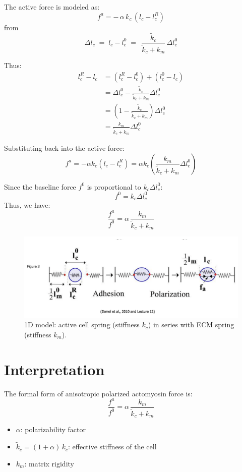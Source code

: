 \documentclass[a4paper,margin=1in]{article}
\begin{document}
The active force is modeled as:
\[
  f^a = -\,\alpha\,k_c\,(l_c - l_c^R)
\]
from
\[
  \Delta l_c \;=\; l_c - l_c^0 \;=\; \,\frac{\tilde{k}_c}{\tilde{k}_c + k_m} \,\Delta l_c^0
\]

Thus:
\begin{align*}
l_c^R - l_c &= (l_c^R - l_c^0) + (l_c^0 - l_c) \\
&= \Delta l_c^0 - \frac{\tilde{k}_c}{\tilde{k}_c + k_m} \Delta l_c^0 \\
&= \left(1 - \frac{\tilde{k}_c}{\tilde{k}_c + k_m} \right) \Delta l_c^0 \\
&= \frac{k_m}{\tilde{k}_c + k_m} \Delta l_c^0
\end{align*}

Substituting back into the active force:
\[
f^a = -\alpha k_c (l_c - l_c^R) = \alpha k_c \left( \frac{k_m}{\tilde{k}_c + k_m} \Delta l_c^0 \right)
\]

Since the baseline force \(f^0\) is proportional to \(k_c \Delta l_c^0\):
\[
f^0 = k_c \Delta l_c^0
\]
Thus, we have:
\[
\boxed{
\frac{f^a}{f^0} = \alpha \, \frac{k_m}{\tilde{k}_c + k_m}
}
\]

\begin{figure}[h!]
  \centering
  \includegraphics[width=1\textwidth]{springs}
  \caption{1D model: active cell spring (stiffness \(k_c\)) in series with 
  ECM spring (stiffness \(k_m\)).}
  \label{fig:1d-spring-model}
\end{figure}

\section*{Interpretation}

The formal form of anisotropic polarized actomyosin force is:
\[
  \frac{f^{a}}{f^{0}}
  = \alpha \,\frac{k_{m}}{\tilde{k}_{c} + k_{m}}
\]

\begin{itemize}
  \item $\displaystyle \alpha$: polarizability factor
  \item $\displaystyle \tilde{k}_{c} = (1 + \alpha)\,k_{c}$: effective stiffness of the cell
  \item $k_{m}$: matrix rigidity
\end{itemize}
\end{document}

